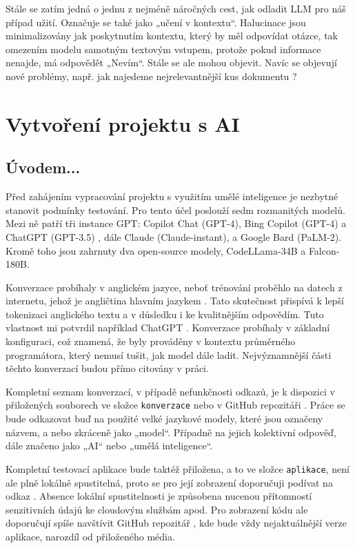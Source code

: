 \documentclass[FM,DP]{tulthesis}
\begin{document}
		Stále se zatím jedná o jednu z nejméně náročných cest, jak odladit LLM pro náš případ užití. Označuje se také jako „učení v kontextu“. Halucinace jsou minimalizovány jak poskytnutím kontextu, který by měl odpovídat otázce, tak omezením modelu samotným textovým vstupem, protože pokud informace nenajde, má odpovědět „Nevím“. Stále se ale mohou objevit. Navíc se objevují nové problémy, např. jak najedeme nejrelevantnější kus dokumentu \cite{paper:RAG}?
		
		\chapter{Vytvoření projektu s AI}
		\section{Úvodem...}
		Před zahájením vypracování projektu s využitím umělé inteligence je nezbytné stanovit podmínky testování. Pro tento účel poslouží sedm rozmanitých modelů. Mezi ně patří tři instance GPT: Copilot Chat (GPT-4), Bing Copilot (GPT-4) a ChatGPT (GPT-3.5) , dále Claude (Claude-instant), a Google Bard (PaLM-2). Kromě toho jsou zahrnuty dva open-source modely, CodeLLama-34B a Falcon-180B.
		
		Konverzace probíhaly v anglickém jazyce, neboť trénování proběhlo na datech z internetu, jehož je angličtina hlavním jazykem \cite{internetLanguages}. Tato skutečnost přispívá k lepší tokenizaci anglického textu a v důsledku i ke kvalitnějším odpovědím. Tuto vlastnost mi potvrdil například ChatGPT \cite{chatgpt_jazyk}. Konverzace probíhaly v základní konfiguraci, což znamená, že byly prováděny v kontextu průměrného programátora, který nemusí tušit, jak model dále ladit. Nejvýznamnější části těchto konverzací budou přímo citovány v práci. 
		
		Kompletní seznam konverzací, v případě nefunkčnosti odkazů, je k dispozici v přiložených souborech ve složce \verb|konverzace| nebo v GitHub repozitáři \cite{promptsRepo}. Práce se bude odkazovat buď na použité velké jazykové modely, které jsou označeny názvem, a nebo zkráceně jako „model“. Případně na jejich kolektivní odpověď, dále značeno jako „AI“ nebo „umělá inteligence“.
		
		Kompletní testovací aplikace bude taktéž přiložena, a to ve složce \verb|aplikace|, není ale plně lokálně spustitelná, proto se pro její zobrazení doporučuji podívat na odkaz \cite{final_app}. Absence lokální spustitelnosti je způsobena nucenou přítomností senzitivních údajů ke cloudovým službám apod. Pro zobrazení kódu ale doporučují spíše navštívit GitHub repozitář \cite{gh_final_app}, kde bude vždy nejaktuálnější verze aplikace, narozdíl od přiloženého média. 
		
\end{document}

